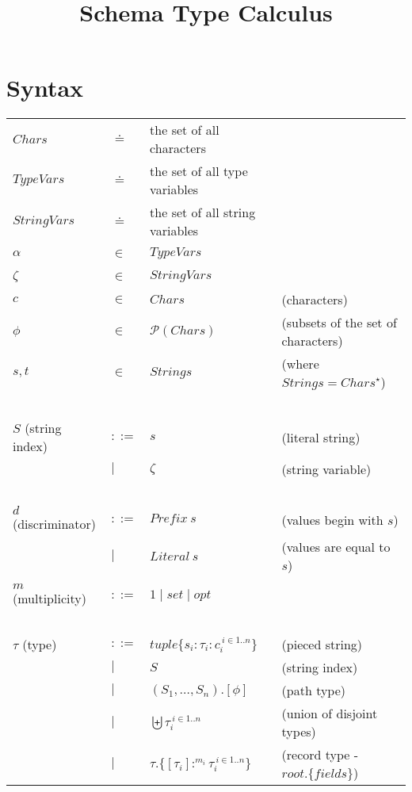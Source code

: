 \documentclass{article}
\title{Schema Type Calculus}
\begin{document}
\maketitle

\section*{Syntax}

\begin{tabular}{llll}
$\mathit{Chars}$ & $\doteq$ & the set of all characters \\
$\mathit{TypeVars}$ & $\doteq$ & the set of all type variables \\
$\mathit{StringVars}$ & $\doteq$ & the set of all string variables \\
$\alpha$ & $\in$ & $\mathit{TypeVars}$ & ~ \\
$\zeta$ & $\in$ & $\mathit{StringVars}$ & ~ \\
$c$ & $\in$ & $\mathit{Chars}$ & (characters) \\
$\phi$ & $\in$ & $\mathcal P(\mathit{Chars})$ & (subsets of the set of characters) \\
$s,t$ & $\in$ & $\mathit{Strings}$ & (where $\mathit{Strings} = \mathit{Chars}^{\star}$) \\~\\
$S$ (string index) & $::=$ & $s$ & (literal string) \\
                   & $\mid$ & $\zeta$ & (string variable) \\~\\
$d$ (discriminator) & $::=$  & $\mathit{Prefix}~s$ & (values begin with $s$) \\
    & $\mid$ & $\mathit{Literal}~s$ & (values are equal to $s$) \\
 & & \\
$m$ (multiplicity) & $::=$ & $1 \mid \mathit{set} \mid \mathit{opt}$\\~\\
$\tau$ (type) & $::=$ & $\mathit{tuple} \{ s_i : \tau_i : c_i^{~i \in 1..n} \}$ & (pieced string) \\
       & $\mid$ & $S$ & (string index) \\
       & $\mid$ & $(S_1,\ldots,S_n).[\phi]$ & (path type) \\
       & $\mid$ & $\biguplus \tau_i^{~i \in 1..n}$ & (union of disjoint types) \\ 
       & $\mid$ & $\tau.\{[\tau_i] :^{m_i} \tau_i ^{~i \in 1..n}\}$ & (record type - $\mathit{root}.\{ fields \}$) \\ 

\end{tabular}
\end{document}
